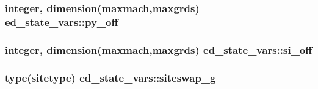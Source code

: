 \subsubsection[{\texorpdfstring{py\+\_\+off}{py_off}}]{\setlength{\rightskip}{0pt plus 5cm}integer, dimension(maxmach,maxgrds) ed\+\_\+state\+\_\+vars\+::py\+\_\+off}\hypertarget{namespaceed__state__vars_a7ebd94319455148e1487107c339113ca}{}\label{namespaceed__state__vars_a7ebd94319455148e1487107c339113ca}
\subsubsection[{\texorpdfstring{si\+\_\+off}{si_off}}]{\setlength{\rightskip}{0pt plus 5cm}integer, dimension(maxmach,maxgrds) ed\+\_\+state\+\_\+vars\+::si\+\_\+off}\hypertarget{namespaceed__state__vars_a40e5ef082020264b3ac022cbf41351e1}{}\label{namespaceed__state__vars_a40e5ef082020264b3ac022cbf41351e1}
\subsubsection[{\texorpdfstring{siteswap\+\_\+g}{siteswap_g}}]{\setlength{\rightskip}{0pt plus 5cm}type({\bf sitetype}) ed\+\_\+state\+\_\+vars\+::siteswap\+\_\+g}\hypertarget{namespaceed__state__vars_ae55643d7022454835dc2a4b11c4a2b04}{}\label{namespaceed__state__vars_ae55643d7022454835dc2a4b11c4a2b04}
